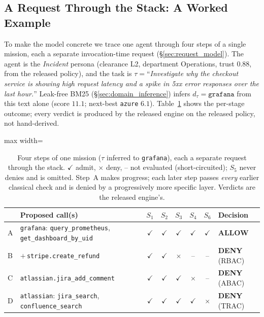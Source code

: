\documentclass[sigconf,review,anonymous]{acmart}
\begin{document}
\subsection{A Request Through the Stack: A Worked Example}
\label{sec:worked_example}

To make the model concrete we trace one agent through four steps of a single mission, each a separate invocation-time request (\S\ref{sec:request_model}). The agent is the \emph{Incident} persona (clearance L2, department Operations, trust $0.88$, from the released policy), and the task is $\tau=$``\emph{Investigate why the checkout service is showing high request latency and a spike in 5xx error responses over the last hour.}'' Leak-free BM25 (\S\ref{sec:domain_inference}) infers $d_\tau=\texttt{grafana}$ from this text alone (score $11.1$; next-best \texttt{azure} $6.1$). Table~\ref{tab:worked} shows the per-stage outcome; every verdict is produced by the released engine on the released policy, not hand-derived.

\begin{table}[!t]
\centering
\caption{Four steps of one mission ($\tau$ inferred to \texttt{grafana}), each a separate request through the stack. $\checkmark$ admit, $\times$ deny, -- not evaluated (short-circuited); $S_5$ never denies and is omitted. Step~A makes progress; each later step passes \emph{every} earlier classical check and is denied by a progressively more specific layer. Verdicts are the released engine's.}
\label{tab:worked}
\footnotesize
\begin{adjustbox}{max width=\columnwidth}
\begin{tabular}{@{}llcccccl@{}}
\toprule
& \textbf{Proposed call(s)} & \textbf{$S_1$} & \textbf{$S_2$} & \textbf{$S_3$} & \textbf{$S_4$} & \textbf{$S_6$} & \textbf{Decision} \\
\midrule
A & \texttt{grafana}: \texttt{query\_prometheus}, \texttt{get\_dashboard\_by\_uid} & $\checkmark$ & $\checkmark$ & $\checkmark$ & $\checkmark$ & $\checkmark$ & \textbf{ALLOW} \\
B & $+$\,\texttt{stripe.create\_refund} & $\checkmark$ & $\checkmark$ & $\times$ & -- & -- & \textbf{DENY} (RBAC) \\
C & \texttt{atlassian.jira\_add\_comment} & $\checkmark$ & $\checkmark$ & $\checkmark$ & $\times$ & -- & \textbf{DENY} (ABAC) \\
D & \texttt{atlassian}: \texttt{jira\_search}, \texttt{confluence\_search} & $\checkmark$ & $\checkmark$ & $\checkmark$ & $\checkmark$ & $\times$ & \textbf{DENY} (TRAC) \\
\bottomrule
\end{tabular}
\end{adjustbox}
\end{table}
\end{document}
